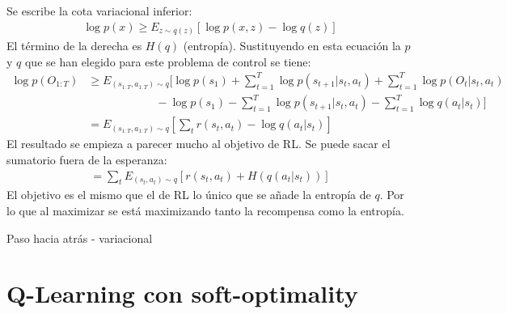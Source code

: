 Se escribe la cota variacional inferior:
\begin{align}
\operatorname { log } p ( x ) \geq E _ { z \sim q ( z ) } [ \operatorname { log } p ( x , z ) - \operatorname { log } q ( z ) ]
\end{align}
El término de la derecha es $H(q)$ (entropía). Sustituyendo en esta ecuación la $p$ y $q$ que se
han elegido para este problema de control se tiene:
\begin{align}
    \nonumber\operatorname { log } p ( O _ { 1 : T } ) &\geq E _ { ( s _ { 1 : T } , a _ { 1 : T } ) \sim q } [
\operatorname { log } p ( s _ { 1 } ) + \sum _ { t = 1 } ^ { T } \operatorname { log } p ( s _ { t + 1 } | s _ { t } , a _ { t } ) + \sum _ { t = 1 } ^ { T } \operatorname { log } p ( O _ { t } | s _ { t } , a _ { t } )
                                                     \\&\quad\quad\quad\quad\quad\quad - \operatorname { log } p ( s _ { 1 } ) - \sum _ { t = 1 } ^ { T } \operatorname { log } p ( s _ { t + 1 } | s _ { t } , a _ { t } ) - \sum _ { t = 1 } ^ { T } \operatorname { log } q ( a _ { t } | s _ { t } ) ]
\\
  &= E _ { ( s _ { 1 : T } , a _ { 1 : T } ) \sim q } [ \sum _ { t } r ( s _ { t } , a _ { t } ) - \operatorname { log } q ( a _ { t } | s _ { t } ) ]
\end{align}
El resultado se empieza a parecer mucho al objetivo de RL. Se puede sacar el sumatorio fuera de
la esperanza:
\begin{align}
= \sum _ { t } E _ { ( s _ { t } , a _ { t } ) \sim q } [ r ( s _ { t } , a _ { t } ) + H ( q ( a _ { t } | s _ { t } ) ) ]
\end{align}
El objetivo es el mismo que el de RL lo único que se añade la entropía de $q$. Por lo que al
maximizar se está maximizando tanto la recompensa como la entropía.

\begin{algorithm}
    \caption{Paso hacia atrás - variacional}
\end{algorithm}

\section{Q-Learning con soft-optimality}%
\label{sec:q_learning_con_soft_optimality}

